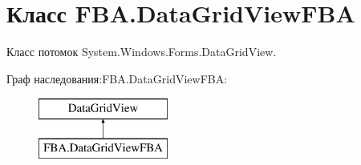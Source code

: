 \hypertarget{class_f_b_a_1_1_data_grid_view_f_b_a}{}\section{Класс F\+B\+A.\+Data\+Grid\+View\+F\+BA}
\label{class_f_b_a_1_1_data_grid_view_f_b_a}


Класс потомок System.\+Windows.\+Forms.\+Data\+Grid\+View.  


Граф наследования\+:F\+B\+A.\+Data\+Grid\+View\+F\+BA\+:\begin{figure}[H]
\begin{center}
\leavevmode
\includegraphics[height=2.000000cm]{class_f_b_a_1_1_data_grid_view_f_b_a}
\end{center}
\end{figure}

